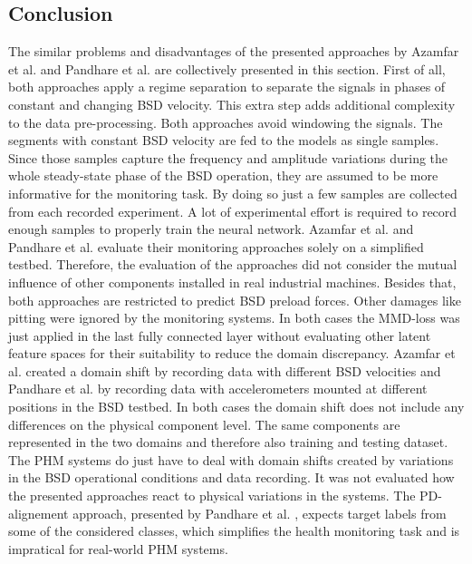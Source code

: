 \subsection{Conclusion}
The similar problems and disadvantages of the presented approaches by Azamfar et al. \cite{AZAMFAR2020103932} and Pandhare et al. \cite{Pandhare2021} are collectively presented in this section. First of all, both approaches apply a regime separation to separate the signals in phases of constant and changing BSD velocity. This extra step adds additional complexity to the data pre-processing. Both approaches avoid windowing the signals. The segments with constant BSD velocity are fed to the models as single samples. Since those samples capture the frequency and amplitude variations during the whole steady-state phase of the BSD operation, they are assumed to be more informative for the monitoring task. By doing so just a few samples are collected from each recorded experiment. A lot of experimental effort is required to record enough samples to properly train the neural network. Azamfar et al. \cite{AZAMFAR2020103932} and  Pandhare et al. \cite{Pandhare2021} evaluate their monitoring approaches solely on a simplified testbed. Therefore, the evaluation of the approaches did not consider the mutual influence of other components installed in real industrial machines. Besides that, both approaches are restricted to predict BSD preload forces. Other damages like pitting were ignored by the monitoring systems. In both cases the MMD-loss was just applied in the last fully connected layer without evaluating other latent feature spaces for their suitability to reduce the domain discrepancy. Azamfar et al. \cite{AZAMFAR2020103932} created a domain shift by recording data with different BSD velocities and Pandhare et al. \cite{Pandhare2021} by recording data with accelerometers mounted at different positions in the BSD testbed. In both cases the domain shift does not include any differences on the physical component level. The same components are represented in the two domains and therefore also training and testing dataset. The PHM systems do just have to deal with domain shifts created by variations in the BSD operational conditions and data recording. It was not evaluated how the presented approaches react to physical variations in the systems. The PD-alignement approach, presented by Pandhare et al.  \cite{Pandhare2021}, expects target labels from some of the considered classes, which simplifies the health monitoring task and is impratical for real-world PHM systems.

